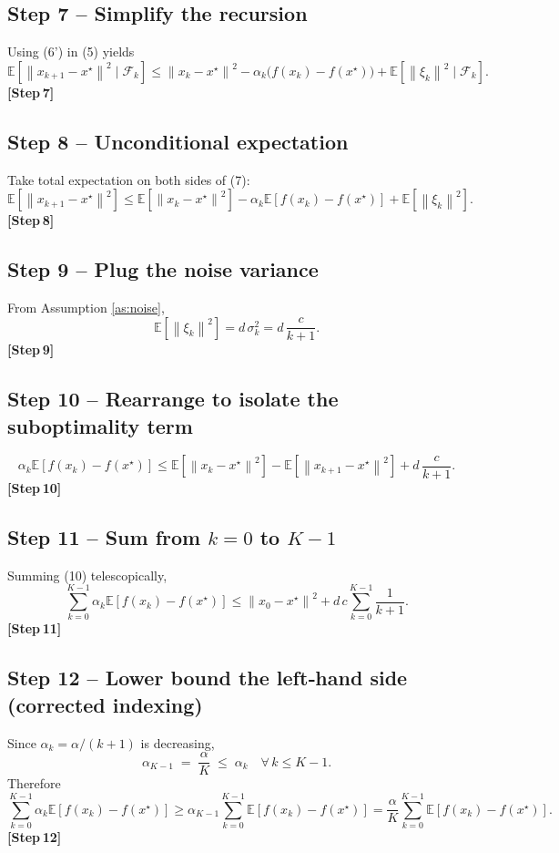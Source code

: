 \documentclass{article}
\newcommand{\E}{\mathbb{E}}
\newcommand{\norm}[1]{\left\lVert #1\right\rVert}
\begin{document}
\subsection*{Step 7 – Simplify the recursion}
Using (6') in (5) yields
\[
\E\!\left[\norm{x_{k+1}-x^\star}^{2}\mid\mathcal F_k\right]
\le \norm{x_k-x^\star}^{2}
-\alpha_k\bigl(f(x_k)-f(x^\star)\bigr)
+\E\!\left[\norm{\xi_k}^{2}\mid\mathcal F_k\right].
\tag{7}
\]
\textbf{[Step 7]}

\subsection*{Step 8 – Unconditional expectation}
Take total expectation on both sides of (7):
\[
\E\!\left[\norm{x_{k+1}-x^\star}^{2}\right]
\le \E\!\left[\norm{x_k-x^\star}^{2}\right]
-\alpha_k\E\!\left[f(x_k)-f(x^\star)\right]
+\E\!\left[\norm{\xi_k}^{2}\right].
\tag{8}
\]
\textbf{[Step 8]}

\subsection*{Step 9 – Plug the noise variance}
From Assumption \ref{as:noise},
\[
\E\!\left[\norm{\xi_k}^{2}\right]=d\,\sigma_k^{2}=d\,\frac{c}{k+1}.
\tag{9}
\]
\textbf{[Step 9]}

\subsection*{Step 10 – Rearrange to isolate the suboptimality term}
\[
\alpha_k\E\!\left[f(x_k)-f(x^\star)\right]
\le \E\!\left[\norm{x_k-x^\star}^{2}\right]
-\E\!\left[\norm{x_{k+1}-x^\star}^{2}\right]
+d\,\frac{c}{k+1}.
\tag{10}
\]
\textbf{[Step 10]}

\subsection*{Step 11 – Sum from $k=0$ to $K-1$}
Summing (10) telescopically,
\[
\sum_{k=0}^{K-1}\alpha_k\E\!\left[f(x_k)-f(x^\star)\right]
\le \norm{x_0-x^\star}^{2}
+ d\,c\sum_{k=0}^{K-1}\frac{1}{k+1}.
\tag{11}
\]
\textbf{[Step 11]}

\subsection*{Step 12 – Lower bound the left‑hand side (corrected indexing)}
Since $\alpha_k=\alpha/(k+1)$ is decreasing,
\[
\alpha_{K-1}\;=\;\frac{\alpha}{K}\;\le\;\alpha_k\quad\forall\,k\le K-1.
\]
Therefore
\[
\sum_{k=0}^{K-1}\alpha_k\E\!\left[f(x_k)-f(x^\star)\right]
\ge \alpha_{K-1}\sum_{k=0}^{K-1}\E\!\left[f(x_k)-f(x^\star)\right]
= \frac{\alpha}{K}\sum_{k=0}^{K-1}\E\!\left[f(x_k)-f(x^\star)\right].
\tag{12}
\]
\textbf{[Step 12]}
\end{document}
